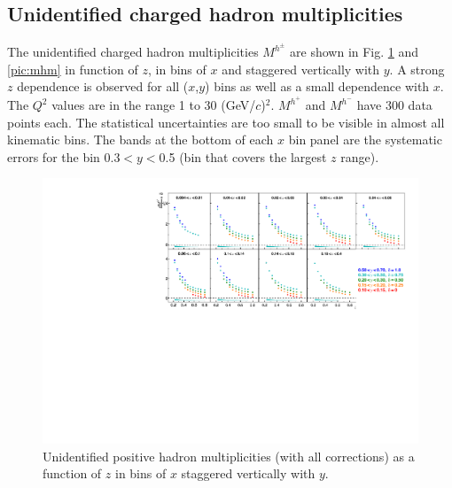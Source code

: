 \subsection{Unidentified charged hadron multiplicities}

The unidentified charged hadron multiplicities $M^{h^{\pm}}$ are shown in Fig. \ref{pic:mhp} and \ref{pic:mhm} in function of $z$, in bins of $x$ and staggered vertically with $y$. A strong $z$ dependence is observed for all ($x$,$y$) bins as well as a small dependence with $x$. The $Q^2$ values are in the range 1 to 30 (GeV/$c$)$^2$. $M^{h^+}$ and $M^{h^-}$ have 300 data points each. The statistical uncertainties are too small to be visible in almost all kinematic bins. The bands at the bottom of each $x$ bin panel are the systematic errors for the bin 0.3$< y <$0.5 (bin that covers the largest $z$ range).

\begin{figure}[!h]
  \centering
	\includegraphics[scale=0.85]{./gfx/hp.pdf}
	\caption{Unidentified positive hadron multiplicities (with all corrections) as a function of $z$ in bins of $x$ staggered vertically with $y$.}
	\label{pic:mhp}
\end{figure}

